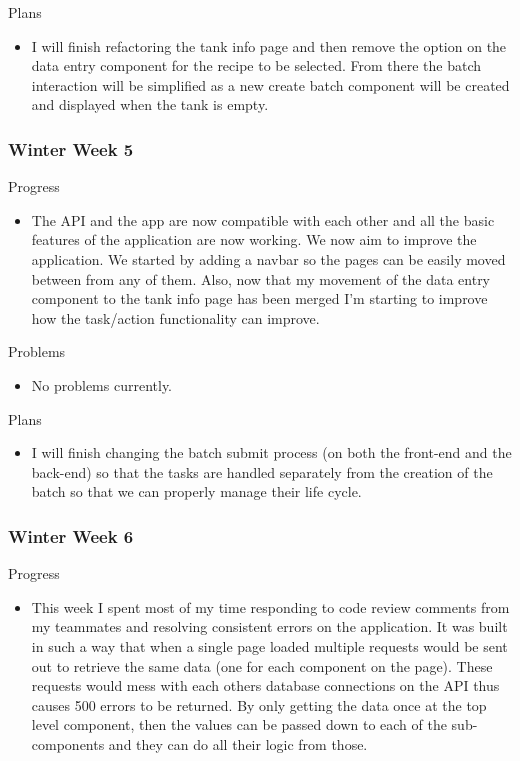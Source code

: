         \noindent
        Plans
        \begin{itemize}
            \item I will finish refactoring the tank info page and then remove the option on the data entry component for the recipe to be selected.  From there the batch interaction will be simplified as a new create batch component will be created and displayed when the tank is empty.
        \end{itemize}
        
    \subsubsection{Winter Week 5}
    
        \noindent
        Progress
        \begin{itemize}
            \item The API and the app are now compatible with each other and all the basic features of the application are now working.  We now aim to improve the application.  We started by adding a navbar so the pages can be easily moved between from any of them.  Also, now that my movement of the data entry component to the tank info page has been merged I’m starting to improve how the task/action functionality can improve.
        \end{itemize}
        
        \noindent
        Problems
        \begin{itemize}
            \item No problems currently.
        \end{itemize}
        
        \noindent
        Plans
        \begin{itemize}
            \item I will finish changing the batch submit process (on both the front-end and the back-end) so that the tasks are handled separately from the creation of the batch so that we can properly manage their life cycle.
        \end{itemize}
        
    \subsubsection{Winter Week 6}
    
        \noindent
        Progress
        \begin{itemize}
            \item This week I spent most of my time responding to code review comments from my teammates and resolving consistent errors on the application.  It was built in such a way that when a single page loaded multiple requests would be sent out to retrieve the same data (one for each component on the page).  These requests would mess with each others database connections on the API thus causes 500 errors to be returned.  By only getting the data once at the top level component, then the values can be passed down to each of the sub-components and they can do all their logic from those.
        \end{itemize}
        
